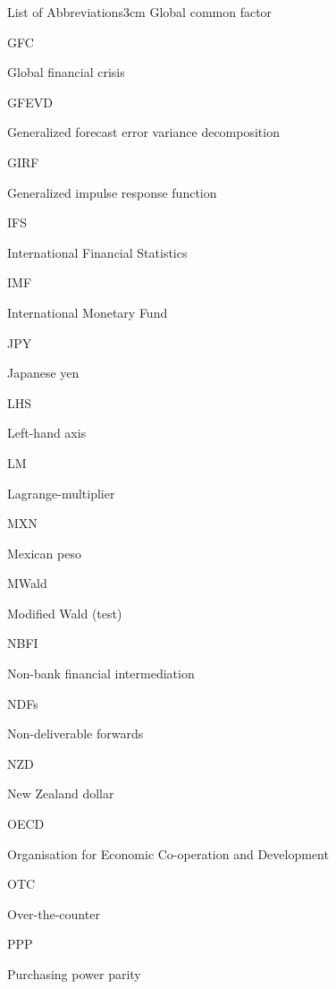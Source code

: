 \documentclass[a4paper, twoside]{templates/ociamthesis}
\begin{document}
\begin{romanpages}
\begin{mclistof}{List of Abbreviations}{3cm}
Global common factor

\item[GFC]

Global financial crisis

\item[GFEVD]

Generalized forecast error variance decomposition

\item[GIRF]

Generalized impulse response function

\item[IFS]

International Financial Statistics

\item[IMF]

International Monetary Fund

\item[JPY]

Japanese yen

\item[LHS]

Left-hand axis

\item[LM]

Lagrange-multiplier

\item[MXN]

Mexican peso

\item[MWald]

Modified Wald (test)

\item[NBFI]

Non-bank financial intermediation

\item[NDFs]

Non-deliverable forwards

\item[NZD]

New Zealand dollar

\item[OECD]

Organisation for Economic Co-operation and Development

\item[OTC]

Over-the-counter

\item[PPP]

Purchasing power parity


\end{mclistof}
\end{romanpages}
\end{document}
